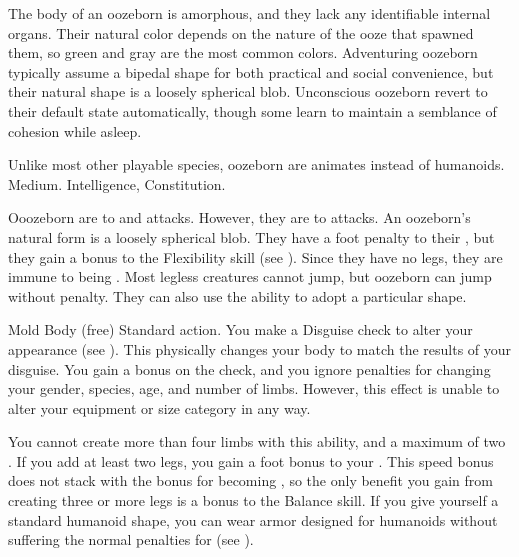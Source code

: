  The body of an oozeborn is amorphous, and they lack any identifiable internal organs.
  Their natural color depends on the nature of the ooze that spawned them, so green and gray are the most common colors.
  Adventuring oozeborn typically assume a bipedal shape for both practical and social convenience, but their natural shape is a loosely spherical blob.
  Unconscious oozeborn revert to their default state automatically, though some learn to maintain a semblance of cohesion while asleep.

   Unlike most other playable species, oozeborn are animates instead of humanoids.
   Medium.
    Intelligence,  Constitution.
  \begin{itemize}
     Ooozeborn are  to \atAcid and \atPoison attacks. However, they are  to \atEarth attacks.
     An oozeborn's natural form is a loosely spherical blob.
      They have a  foot penalty to their , but they gain a  bonus to the Flexibility skill (see ).
      Since they have no legs, they are immune to being \prone.
      Most legless creatures cannot jump, but oozeborn can jump without penalty.
      They can also use the  ability to adopt a particular shape.
      \begin{sustainability}{Mold Body}{ (free)}
        \abilityusagetime Standard action.
        \rankline
        You make a Disguise check to alter your appearance (see ).
        This physically changes your body to match the results of your disguise.
        You gain a  bonus on the check, and you ignore penalties for changing your gender, species, age, and number of limbs.
        However, this effect is unable to alter your equipment or size category in any way.

        You cannot create more than four limbs with this ability, and a maximum of two .
        If you add at least two legs, you gain a  foot bonus to your .
        This speed bonus does not stack with the bonus for becoming , so the only benefit you gain from creating three or more legs is a  bonus to the Balance skill.
        If you give yourself a standard humanoid shape, you can wear armor designed for humanoids without suffering the normal penalties for  (see ).


\end{sustainability}
\end{itemize}
